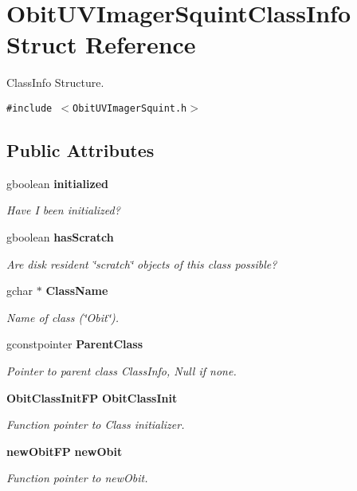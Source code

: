 \section{Obit\-UVImager\-Squint\-Class\-Info Struct Reference}
\label{structObitUVImagerSquintClassInfo}
Class\-Info Structure.  


{\tt \#include $<$Obit\-UVImager\-Squint.h$>$}

\subsection*{Public Attributes}
\begin{CompactItemize}
\item 
gboolean {\bf initialized}
\begin{CompactList}\small\item\em Have I been initialized? \item\end{CompactList}\item 
gboolean {\bf has\-Scratch}
\begin{CompactList}\small\item\em Are disk resident \char`\"{}scratch\char`\"{} objects of this class possible? \item\end{CompactList}\item 
gchar $\ast$ {\bf Class\-Name}
\begin{CompactList}\small\item\em Name of class (\char`\"{}Obit\char`\"{}). \item\end{CompactList}\item 
gconstpointer {\bf Parent\-Class}
\begin{CompactList}\small\item\em Pointer to parent class Class\-Info, Null if none. \item\end{CompactList}\item 
{\bf Obit\-Class\-Init\-FP} {\bf Obit\-Class\-Init}
\begin{CompactList}\small\item\em Function pointer to Class initializer. \item\end{CompactList}\item 
{\bf new\-Obit\-FP} {\bf new\-Obit}
\begin{CompactList}\small\item\em Function pointer to new\-Obit. \item\end{CompactList}\item 

\end{CompactItemize}
